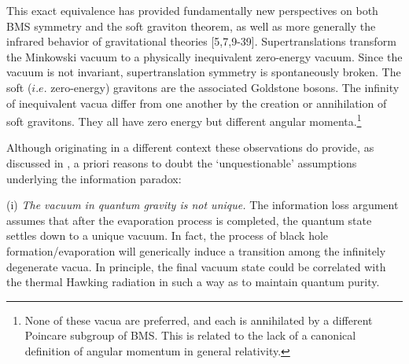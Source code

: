 \documentclass[12pt]{article}
\numberwithin{equation}{section}
\begin{document}
  This exact equivalence has provided fundamentally new perspectives on both BMS symmetry and the soft graviton theorem, as well as more generally the infrared behavior of gravitational theories [5,7,9-39].
 Supertranslations transform the Minkowski vacuum to a physically inequivalent zero-energy vacuum.  Since the vacuum is not invariant, supertranslation symmetry is spontaneously broken.  The soft ($i.e.$ zero-energy) gravitons are the associated Goldstone bosons. The infinity of inequivalent vacua differ from one another by the creation or annihilation of soft gravitons. They all have zero energy but different angular momenta.\footnote{None of these vacua are preferred, and each is annihilated by a different Poincare subgroup of BMS.  
  This is related to the lack of a canonical definition of angular momentum in general relativity.}
  
  Although originating in a different context these observations do provide, as discussed in \cite{Strominger:2014pwa, Pasterski:2015tva},  a priori reasons to doubt  the `unquestionable' assumptions underlying the information paradox:    
  
  \noindent(i) {\it The vacuum in quantum gravity is not unique.} The information loss argument assumes that after the evaporation process is completed, the quantum state settles down to a unique vacuum. In fact, the process of black hole formation/evaporation will generically induce a transition among the infinitely degenerate vacua. In principle, the final vacuum state could be correlated with the thermal Hawking radiation in such a way as to 
  maintain quantum purity. 
  
\end{document}

